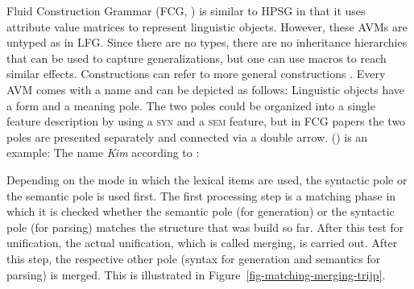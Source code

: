 Fluid Construction Grammar (FCG, \citealp{SteelsFluid-ed}) is similar to HPSG in that it uses
attribute value matrices to represent linguistic objects. However, these AVMs are untyped as in
LFG. Since there are no types, there are no inheritance hierarchies that can be used to capture generalizations, but one can use macros to reach
similar effects. Constructions can refer to more general constructions \citep[]{vanTrijp2013a}. Every AVM
comes with a name and can be depicted as follows:
\ea
{}
\z
\addlines[2]
Linguistic objects have a form and a meaning pole. The two poles could be organized into a single feature
description by using a \textsc{syn} and a \textsc{sem} feature, but in FCG papers the two poles are
presented separately and connected via a double arrow. () is an example:
\ea
The name \emph{Kim} according to \citet[]{vanTrijp2013a}:\\
\z
Depending on the mode in which the lexical items are used, the syntactic pole or the semantic pole
is used first. The first processing step is a matching phase in which it is checked whether the
semantic pole (for generation) or the syntactic pole (for parsing) matches the structure that was
build so far. After this test for unification, the actual unification, which is called merging, is
carried out. After this step, the respective other pole (syntax for generation and semantics for
parsing) is merged. This is illustrated in Figure~\vref{fig-matching-merging-trijp}.

